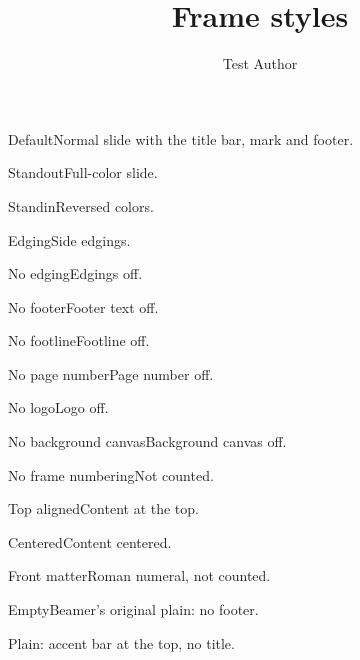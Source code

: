 \documentclass[aspectratio=169,10pt]{beamer}
\title{Frame styles}
\author{Test Author}
\begin{document}
\maketitle
\begin{frame}{Default}Normal slide with the title bar, mark and footer.\end{frame}
\begin{frame}[standout]{Standout}Full-color slide.\end{frame}
\begin{frame}[standin]{Standin}Reversed colors.\end{frame}
\begin{frame}[edging]{Edging}Side edgings.\end{frame}
\begin{frame}[noedging]{No edging}Edgings off.\end{frame}
\begin{frame}[nofooter]{No footer}Footer text off.\end{frame}
\begin{frame}[nofootline]{No footline}Footline off.\end{frame}
\begin{frame}[nopagenumber]{No page number}Page number off.\end{frame}
\begin{frame}[nologo]{No logo}Logo off.\end{frame}
\begin{frame}[noBGC]{No background canvas}Background canvas off.\end{frame}
\begin{frame}[noframenumbering]{No frame numbering}Not counted.\end{frame}
\begin{frame}[t]{Top aligned}Content at the top.\end{frame}
\begin{frame}[c]{Centered}Content centered.\end{frame}
\begin{frame}[jobyfront]{Front matter}Roman numeral, not counted.\end{frame}
\begin{frame}[empty]{Empty}Beamer's original plain: no footer.\end{frame}
\begin{frame}[plain,c]Plain: accent bar at the top, no title.\end{frame}
\end{document}
